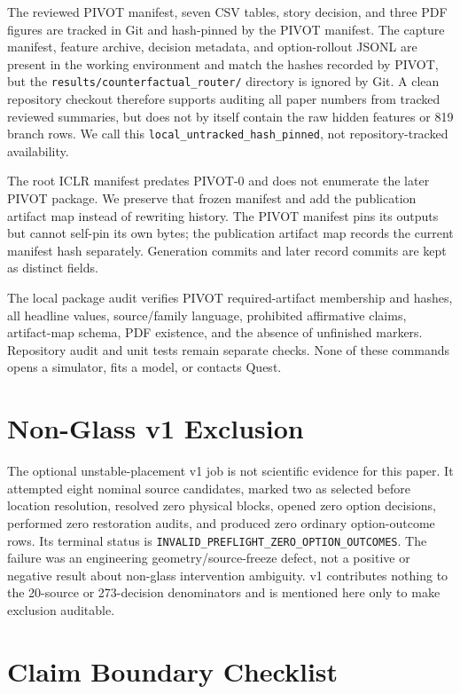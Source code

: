The reviewed PIVOT manifest, seven CSV tables, story decision, and three PDF
figures are tracked in Git and hash-pinned by the PIVOT manifest. The capture
manifest, feature archive, decision metadata, and option-rollout JSONL are
present in the working environment and match the hashes recorded by PIVOT, but
the \texttt{results/counterfactual\_router/} directory is ignored by Git. A
clean repository checkout therefore supports auditing all paper numbers from
tracked reviewed summaries, but does not by itself contain the raw hidden
features or 819 branch rows. We call this
\texttt{local\_untracked\_hash\_pinned}, not repository-tracked availability.

The root ICLR manifest predates PIVOT-0 and does not enumerate the later PIVOT
package. We preserve that frozen manifest and add the publication artifact map
instead of rewriting history. The PIVOT manifest pins its outputs but cannot
self-pin its own bytes; the publication artifact map records the current
manifest hash separately. Generation commits and later record commits are kept
as distinct fields.

The local package audit verifies PIVOT required-artifact membership and hashes,
all headline values, source/family language, prohibited affirmative claims,
artifact-map schema, PDF existence, and the absence of unfinished markers.
Repository audit and unit tests remain separate checks. None of these commands
opens a simulator, fits a model, or contacts Quest.

\section{Non-Glass v1 Exclusion}
\label{app:nonglass}

The optional unstable-placement v1 job is not scientific evidence for this
paper. It attempted eight nominal source candidates, marked two as selected
before location resolution, resolved zero physical blocks, opened zero option
decisions, performed zero restoration audits, and produced zero ordinary
option-outcome rows. Its terminal status is
\texttt{INVALID\_PREFLIGHT\_ZERO\_OPTION\_OUTCOMES}. The failure was an
engineering geometry/source-freeze defect, not a positive or negative result
about non-glass intervention ambiguity. v1 contributes nothing to the 20-source
or 273-decision denominators and is mentioned here only to make exclusion
auditable.

\section{Claim Boundary Checklist}
\label{app:claims}

